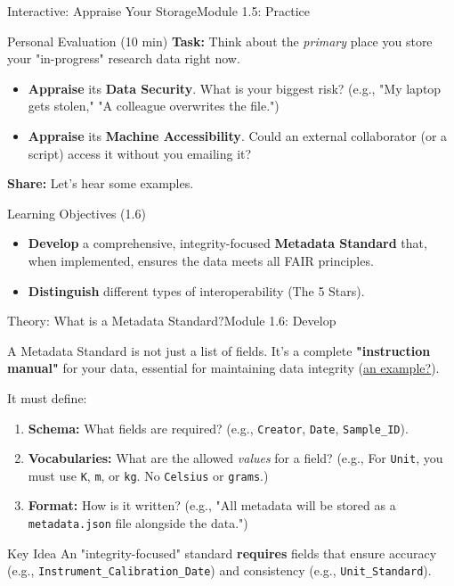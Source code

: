\begin{frame}{Interactive: Appraise Your Storage}{Module 1.5: Practice}
    \begin{block}{Personal Evaluation (10 min)}
        \textbf{Task:} Think about the \emph{primary} place you store your "in-progress" research data right now.
        \begin{itemize}
            \item \textbf{Appraise} its \textbf{Data Security}. What is your biggest risk? (e.g., "My laptop gets stolen," "A colleague overwrites the file.")
            \pause
            \item \textbf{Appraise} its \textbf{Machine Accessibility}. Could an external collaborator (or a script) access it without you emailing it?
        \end{itemize}
        \pause
        \textbf{Share:} Let's hear some examples.
    \end{block}
\end{frame}

\begin{frame}{Learning Objectives (1.6)}
    \begin{itemize}
        \item \textbf{Develop} a comprehensive, integrity-focused \textbf{Metadata Standard} that, when implemented, ensures the data meets all FAIR principles.
        \item \textbf{Distinguish} different types of interoperability (The 5 Stars).
    \end{itemize}
\end{frame}

\begin{frame}{Theory: What is a Metadata Standard?}{Module 1.6: Develop}

    A Metadata Standard is not just a list of fields. It's a complete \textbf{"instruction manual"} for your data, essential for maintaining data integrity (\href{https://github.com/OpenEnergyPlatform/oemetadata}{an example?}).

    It must define:
    \begin{enumerate}
        \pause
        \item \textbf{Schema:} What fields are required? (e.g., \texttt{Creator}, \texttt{Date}, \texttt{Sample\_ID}).
        \pause
        \item \textbf{Vocabularies:} What are the allowed \textit{values} for a field? (e.g., For \texttt{Unit}, you must use \texttt{K}, \texttt{m}, or \texttt{kg}. No \texttt{Celsius} or \texttt{grams}.)
        \pause
        \item \textbf{Format:} How is it written? (e.g., "All metadata will be stored as a \texttt{metadata.json} file alongside the data.")
    \end{enumerate}
    \pause
    \begin{block}{Key Idea}
        An "integrity-focused" standard \textbf{requires} fields that ensure accuracy (e.g., \texttt{Instrument\_Calibration\_Date}) and consistency (e.g., \texttt{Unit\_Standard}).
    \end{block}
\end{frame}

